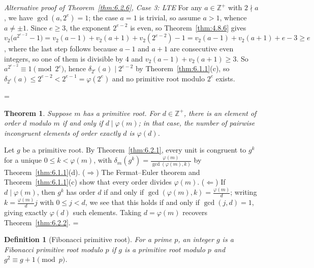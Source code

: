 \documentclass[11pt]{article}
\makeatletter
\let\nt@closedisplay\]
\def\nt@guardedclose{\@ifnextchar\par{\nt@closeafterpar}{\@ifnextchar\end{\postdisplaypenalty\@M\nt@closedisplay}{\nt@closedisplay}}}
\def\nt@closeafterpar\par{\@ifnextchar\par{\nt@closeafterpar}{\@ifnextchar\end{\postdisplaypenalty\@M\nt@closedisplay\par}{\nt@closedisplay\par}}}
\renewenvironment{proof}[1][\proofname]{\par
  \pushQED{\qed}\normalfont\topsep\medskipamount\edef\nt@afterproof{\@endparpenalty=\the\@endparpenalty\relax}\@beginparpenalty\@M\@endparpenalty\@M\let\]\nt@guardedclose\trivlist\item[]\textit{#1\@addpunct{.}} \ignorespaces}{\ifvmode\addpenalty\@M\fi\popQED\nt@afterproof\endtrivlist\@endpefalse}
\theoremstyle{ntstyle}
\newtheorem{theorem}{Theorem}[subsection]
\newtheorem{definition}{Definition}[subsection]
\newenvironment{altproof}[1][\proofname]
  {\begin{proof}[#1]\renewcommand{\qedsymbol}{}}{\end{proof}}
\makeatother
\begin{document}
\begin{altproof}[Alternative proof of Theorem~\ref{thm:6.2.6}, Case 3: LTE] For any $a \in \mathbb{Z}^+$ with
  $2 \nmid a$, we have $\gcd(a, 2^e) = 1$; the case $a = 1$ is trivial, so assume $a > 1$, whence $a \neq \pm 1$.
  Since $e \ge 3$, the exponent $2^{e-2}$ is even, so Theorem~\ref{thm:4.8.6} gives
  $v_2\big(a^{2^{e-2}} - 1\big) = v_2(a-1) + v_2(a+1) + v_2(2^{e-2}) - 1 = v_2(a-1) + v_2(a+1) + e - 3 \ge e$,
  where the last step follows because $a-1$ and $a+1$ are consecutive
  even integers, so one of them is divisible by $4$ and $v_2(a-1) + v_2(a+1) \ge 3$. So
  $a^{2^{e-2}} \equiv 1 \pmod{2^e}$, hence $\delta_{2^e}(a) \mid 2^{e-2}$ by Theorem~\ref{thm:6.1.1}(c), so
  $\delta_{2^e}(a) \le 2^{e-2} < 2^{e-1} = \varphi(2^e)$ and no primitive root modulo $2^{e}$ exists.

\end{altproof}

\begin{theorem}\label{thm:6.2.7}
  Suppose $m$ has a primitive root. For $d \in \mathbb{Z}^+$, there
  is an element of order $d$ modulo $m$ if and only if $d \mid \varphi(m)$; in that case, the number of pairwise
  incongruent elements
  of order exactly $d$ is $\varphi(d)$.

\end{theorem}

\begin{proof} Let $g$ be a primitive root. By Theorem~\ref{thm:6.2.1}, every unit is congruent to $g^{k}$ for a unique $0 \le k < \varphi(m)$, with $\delta_m(g^{k}) = \tfrac{\varphi(m)}{\gcd(\varphi(m), k)}$ by Theorem~\ref{thm:6.1.1}(d).
  ($\Rightarrow$) The Fermat--Euler theorem and Theorem~\ref{thm:6.1.1}(c) show that every
  order divides $\varphi(m)$. ($\Leftarrow$) If $d \mid \varphi(m)$, then
  $g^{k}$ has order $d$ if and only if $\gcd(\varphi(m), k) = \tfrac{\varphi(m)}{d}$; writing
  $k = \tfrac{\varphi(m)}{d}j$ with
  $0\le j<d$, we see that this holds if and only if $\gcd(j,d)=1$, giving exactly $\varphi(d)$ such
  elements. Taking $d = \varphi(m)$ recovers Theorem~\ref{thm:6.2.2}.
\end{proof}

\begin{definition}[Fibonacci primitive root]\label{def:6.2.2}\label{def:fibonacci-primitive-root}
  For a
  prime $p$, an integer $g$ is a Fibonacci primitive root modulo $p$ if $g$ is a
  primitive root modulo $p$ and $g^{2} \equiv g + 1 \pmod{p}$.

\end{definition}
\end{document}
